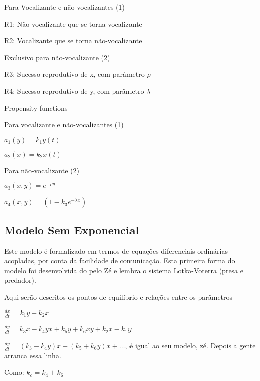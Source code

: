 Para Vocalizante e não-vocalizantes (1)

R1: Não-vocalizante que se torna vocalizante

R2: Vocalizante que se torna não-vocalizante

\vspace{3 mm}
Exclusivo para não-vocalizante (2)

R3: Sucesso reprodutivo de x, com parâmetro $\rho$

R4: Sucesso reprodutivo de y, com parâmetro $\lambda$

\vspace{3 mm}
Propensity functions

\vspace{3 mm}
Para vocalizante e não-vocalizantes (1)

\vspace{3 mm}
$a_1(y)=k_1 y(t)$

\vspace{3 mm}
$a_2(x)=k_2 x(t)$

\vspace{3 mm}
Para não-vocalizante (2)

\vspace{3 mm}
$a_3(x,y)=e^{-\rho y}$

\vspace{3 mm}
$a_4(x,y)=(1-k_3 e^{-\lambda x})$

\subsection{Modelo Sem Exponencial}
Este modelo é formalizado em termos de equações diferenciais ordinárias acopladas, por conta da facilidade de comunicação. Esta primeira forma do modelo foi desenvolvida do pelo Zé e lembra o sistema Lotka-Voterra (presa e predador).

Aqui serão descritos os pontos de equilíbrio e relações entre os parâmetros

\vspace{3 mm}
$\frac{dx}{dt} = k_1 y - k_2 x$

\vspace{3 mm}
$\frac{dy}{dt} = k_3 x - k_4 y x + k_5 y + k_6 x y + k_2 x - k_1 y$

\vspace{3 mm}
$\frac{dy}{dt} = (k_3 - k_4 y)x + (k_5 + k_6 y)x + \ldots$, é igual ao seu modelo, zé. Depois a gente arranca essa linha.

\vspace{3 mm}
Como: $k_c= k_4+k_6$

